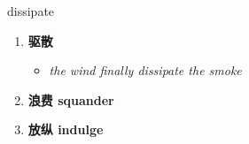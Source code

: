 
\begin{frame}
{\huge dissipate}
\begin{center}
\begin{enumerate}\Large
  \item \textbf{驱散}
  \begin{itemize}
    \item \em{\Large{the wind finally dissipate the smoke}}
  \end{itemize}
  \item \textbf{浪费 squander}
  \item \textbf{放纵 indulge}
\end{enumerate}
\end{center}
\end{frame}
